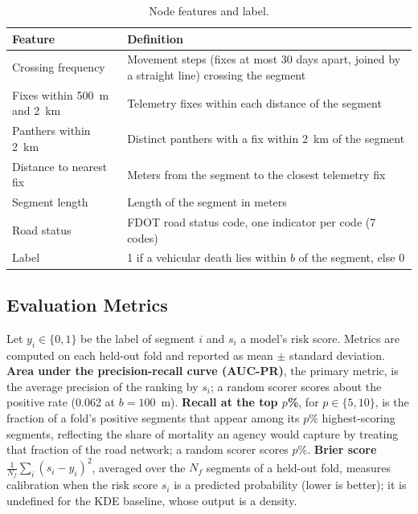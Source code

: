 \begin{table}[t]
\centering
\small
\begin{tabular}{ll}
\hline
\textbf{Feature} & \textbf{Definition} \\
\hline
Crossing frequency & Movement steps (fixes at most 30 days apart, joined by a straight line) crossing the segment \\
Fixes within 500~m and 2~km & Telemetry fixes within each distance of the segment \\
Panthers within 2~km & Distinct panthers with a fix within 2~km of the segment \\
Distance to nearest fix & Meters from the segment to the closest telemetry fix \\
Segment length & Length of the segment in meters \\
Road status & FDOT road status code, one indicator per code (7 codes) \\
Label & 1 if a vehicular death lies within $b$ of the segment, else 0 \\
\hline
\end{tabular}
\caption{Node features and label.}
\label{tab:features}
\end{table}

\subsection{Evaluation Metrics}
Let $y_i\in\{0,1\}$ be the label of segment $i$ and $s_i$ a model's risk score. Metrics are computed on each held-out fold and reported as mean $\pm$ standard deviation.
\textbf{Area under the precision-recall curve (AUC-PR)}, the primary metric, is the average precision of the ranking by $s_i$; a random scorer scores about the positive rate (0.062 at $b=100$~m).
\textbf{Recall at the top $p$\%}, for $p\in\{5,10\}$, is the fraction of a fold's positive segments that appear among its $p$\% highest-scoring segments, reflecting the share of mortality an agency would capture by treating that fraction of the road network; a random scorer scores $p$\%.
\textbf{Brier score} $\frac{1}{N_f}\sum_i (s_i-y_i)^2$, averaged over the $N_f$ segments of a held-out fold, measures calibration when the risk score $s_i$ is a predicted probability (lower is better); it is undefined for the KDE baseline, whose output is a density.

